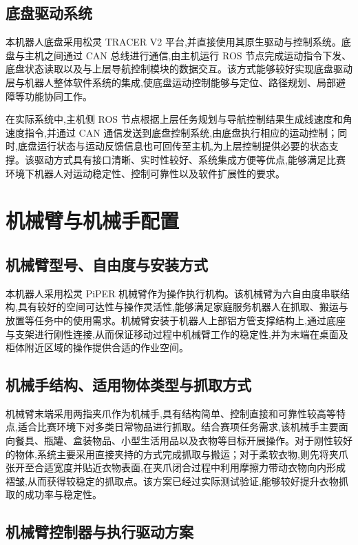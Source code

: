 \documentclass[12pt,hyperref,a4paper,UTF8]{ctexart}
\begin{document}
\subsection{底盘驱动系统}
本机器人底盘采用松灵 TRACER V2 平台,并直接使用其原生驱动与控制系统。底盘与主机之间通过 CAN 总线进行通信,由主机运行 ROS 节点完成运动指令下发、底盘状态读取以及与上层导航控制模块的数据交互。该方式能够较好实现底盘驱动层与机器人整体软件系统的集成,使底盘运动控制能够与定位、路径规划、局部避障等功能协同工作。

在实际系统中,主机侧 ROS 节点根据上层任务规划与导航控制结果生成线速度和角速度指令,并通过 CAN 通信发送到底盘控制系统,由底盘执行相应的运动控制；同时,底盘运行状态与运动反馈信息也可回传至主机,为上层控制提供必要的状态支撑。该驱动方式具有接口清晰、实时性较好、系统集成方便等优点,能够满足比赛环境下机器人对运动稳定性、控制可靠性以及软件扩展性的要求。

\section{机械臂与机械手配置}
\subsection{机械臂型号、自由度与安装方式}

本机器人采用松灵 PiPER 机械臂作为操作执行机构。该机械臂为六自由度串联结构,具有较好的空间可达性与操作灵活性,能够满足家庭服务机器人在抓取、搬运与放置等任务中的使用需求。机械臂安装于机器人上部铝方管支撑结构上,通过底座与支架进行刚性连接,从而保证移动过程中机械臂工作的稳定性,并为末端在桌面及柜体附近区域的操作提供合适的作业空间。

\subsection{机械手结构、适用物体类型与抓取方式}

机械臂末端采用两指夹爪作为机械手,具有结构简单、控制直接和可靠性较高等特点,适合比赛环境下对多类日常物品进行抓取。结合赛项任务需求,该机械手主要面向餐具、瓶罐、盒装物品、小型生活用品以及衣物等目标开展操作。对于刚性较好的物体,系统主要采用直接夹持的方式完成抓取与搬运；对于柔软衣物,则先将夹爪张开至合适宽度并贴近衣物表面,在夹爪闭合过程中利用摩擦力带动衣物向内形成褶皱,从而获得较稳定的抓取点。该方案已经过实际测试验证,能够较好提升衣物抓取的成功率与稳定性。

\subsection{机械臂控制器与执行驱动方案}
\end{document}
